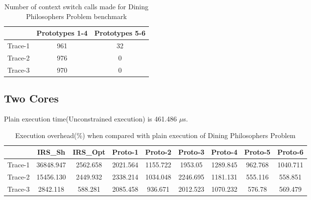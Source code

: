 \begin{table}[h]
\begin{center}
 \begin{tabular}{|c c c|} 
 \hline
 & Prototypes 1-4 & Prototypes 5-6\\ %
 \hline
Trace-1 & 961 & 32\\
Trace-2 & 976 & 0\\
Trace-3 & 970 & 0\\
\hline
\end{tabular}
\end{center}
\caption{Number of context switch calls made for Dining Philosophers Problem benchmark}
\label{dining_phil_num_ctxt}
\end{table}
\newpage
\subsection{Two Cores}
Plain execution time(Unconstrained execution) is 461.486 $\mu$s.
\begin{table}[h]
\begin{center}
 \begin{tabular}{|c c c c c c c c c|} 
 \hline
 & IRS\_Sh & IRS\_Opt& Proto-1 & Proto-2 & Proto-3 & Proto-4 & Proto-5 & Proto-6\\ %
 \hline
Trace-1 & 36848.947 & 2562.658 & 2021.564 & 1155.722 & 1953.05 & 1289.845 & 962.768 & 1040.711\\
Trace-2 & 15456.130 & 2449.932 & 2338.214 & 1034.048 & 2246.695 & 1181.131 & 555.116 & 558.851\\
Trace-3 & 2842.118 & 588.281 & 2085.458 & 936.671 & 2012.523 & 1070.232 & 576.78 & 569.479\\
\hline
\end{tabular}
\end{center}
\caption{Execution overhead(\%) when compared with plain execution of Dining Philosophers Problem}
\label{dining_phil_irs_res_cores_2}
\end{table}


